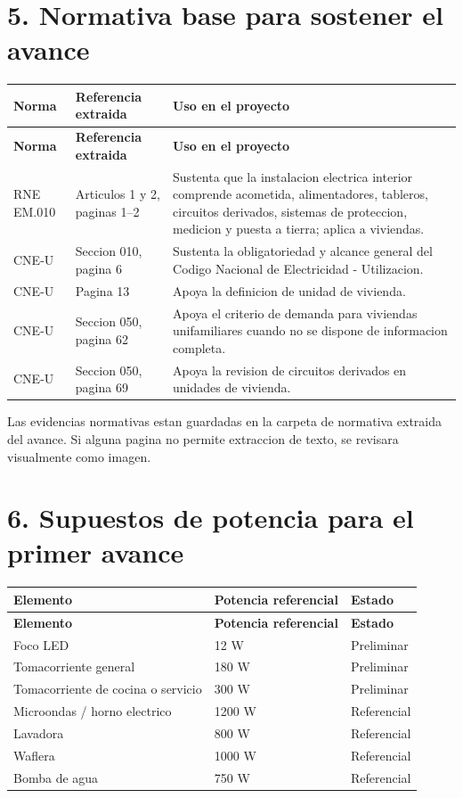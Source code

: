 \documentclass[12pt,a4paper]{article}
\begin{document}
\section*{5. Normativa base para sostener el avance}

\begin{longtable}{L{3.4cm}L{4.8cm}L{6cm}}
\toprule
\textbf{Norma} & \textbf{Referencia extraida} & \textbf{Uso en el proyecto} \\
\midrule
\endfirsthead
\toprule
\textbf{Norma} & \textbf{Referencia extraida} & \textbf{Uso en el proyecto} \\
\midrule
\endhead
RNE EM.010 & Articulos 1 y 2, paginas 1--2 & Sustenta que la instalacion electrica interior comprende acometida, alimentadores, tableros, circuitos derivados, sistemas de proteccion, medicion y puesta a tierra; aplica a viviendas. \\
CNE-U & Seccion 010, pagina 6 & Sustenta la obligatoriedad y alcance general del Codigo Nacional de Electricidad - Utilizacion. \\
CNE-U & Pagina 13 & Apoya la definicion de unidad de vivienda. \\
CNE-U & Seccion 050, pagina 62 & Apoya el criterio de demanda para viviendas unifamiliares cuando no se dispone de informacion completa. \\
CNE-U & Seccion 050, pagina 69 & Apoya la revision de circuitos derivados en unidades de vivienda. \\
\bottomrule
\end{longtable}

Las evidencias normativas estan guardadas en la carpeta de normativa extraida del avance. Si alguna pagina no permite extraccion de texto, se revisara visualmente como imagen.

\section*{6. Supuestos de potencia para el primer avance}

\begin{longtable}{L{7cm}R{4cm}L{3cm}}
\toprule
\textbf{Elemento} & \textbf{Potencia referencial} & \textbf{Estado} \\
\midrule
\endfirsthead
\toprule
\textbf{Elemento} & \textbf{Potencia referencial} & \textbf{Estado} \\
\midrule
\endhead
Foco LED & 12 W & Preliminar \\
Tomacorriente general & 180 W & Preliminar \\
Tomacorriente de cocina o servicio & 300 W & Preliminar \\
Microondas / horno electrico & 1200 W & Referencial \\
Lavadora & 800 W & Referencial \\
Waflera & 1000 W & Referencial \\
Bomba de agua & 750 W & Referencial \\
\bottomrule
\end{longtable}
\end{document}
